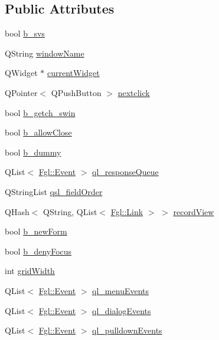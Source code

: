 \subsection*{Public Attributes}
\begin{DoxyCompactItemize}
\item 
bool \hyperlink{classFglForm_a8c411d93b67981a684a5cf6b67111dc1}{b\_\-svs}
\item 
QString \hyperlink{classFglForm_a154084978ed81b8739db7197541881f5}{windowName}
\item 
QWidget $\ast$ \hyperlink{classFglForm_abce220040f982717756bfc10b51dac44}{currentWidget}
\item 
QPointer$<$ QPushButton $>$ \hyperlink{classFglForm_a17945f68955698f41dac6b11cf73cd07}{nextclick}
\item 
bool \hyperlink{classFglForm_ac6325d19f253fe4e7cdfbd50bd027c19}{b\_\-getch\_\-swin}
\item 
bool \hyperlink{classFglForm_af7e3a4c11559a83dd68df64c286fdb1e}{b\_\-allowClose}
\item 
bool \hyperlink{classFglForm_a4dd283ca13e8a699e88783b2946b6841}{b\_\-dummy}
\item 
QList$<$ \hyperlink{structFgl_1_1Event}{Fgl::Event} $>$ \hyperlink{classFglForm_a3aa184c0556d81cfb244f726d95b0538}{ql\_\-responseQueue}
\item 
QStringList \hyperlink{classFglForm_ab53b016e506ad4ed7fdb2ac2210d43b1}{qsl\_\-fieldOrder}
\item 
QHash$<$ QString, QList$<$ \hyperlink{structFgl_1_1Link}{Fgl::Link} $>$ $>$ \hyperlink{classFglForm_a2e8895a4cd6f58cc36f31c8a51c06a54}{recordView}
\item 
bool \hyperlink{classFglForm_ab089d04abad8973c262e3c5e1827b070}{b\_\-newForm}
\item 
bool \hyperlink{classFglForm_a99b822401e45535d412f2a6c5601734d}{b\_\-denyFocus}
\item 
int \hyperlink{classFglForm_a34347fff01950e4574b64c69b62d1ff2}{gridWidth}
\item 
QList$<$ \hyperlink{structFgl_1_1Event}{Fgl::Event} $>$ \hyperlink{classFglForm_a0a20950e5d9deba35525fbcb7935f6f0}{ql\_\-menuEvents}
\item 
QList$<$ \hyperlink{structFgl_1_1Event}{Fgl::Event} $>$ \hyperlink{classFglForm_a764e11f62e1849d568cda143fa11583e}{ql\_\-dialogEvents}
\item 
QList$<$ \hyperlink{structFgl_1_1Event}{Fgl::Event} $>$ \hyperlink{classFglForm_a14b1e58865612b4ebbfa83c8769f9353}{ql\_\-pulldownEvents}

\end{DoxyCompactItemize}
